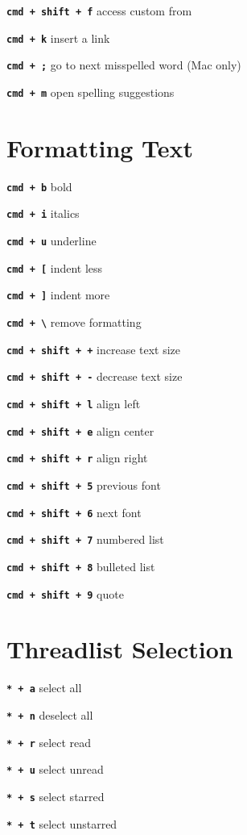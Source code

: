 \documentclass[11pt,letterpaper]{article}
\newcommand{\sck}[1]{\textbf{\texttt{#1}}}
\begin{document}
\sck{cmd + shift  + f} \dotfill access custom from

\sck{cmd  + k} \dotfill insert a link

\sck{cmd + ;} \dotfill go to next misspelled word (Mac only)

\sck{cmd + m} \dotfill open spelling suggestions


\section*{Formatting Text}

\sck{cmd  + b} \dotfill bold

\sck{cmd + i} \dotfill italics

\sck{cmd + u} \dotfill underline

\sck{cmd + [} \dotfill indent less

\sck{cmd + ]} \dotfill indent more

\sck{cmd + \textbackslash } \dotfill remove formatting

\sck{cmd  + shift  + +} \dotfill increase text size

\sck{cmd  + shift  + -} \dotfill decrease text size

\sck{cmd + shift  + l} \dotfill align left

\sck{cmd + shift  + e} \dotfill align center

\sck{cmd + shift  + r} \dotfill align right

\sck{cmd +  shift  + 5} \dotfill previous font

\sck{cmd  + shift  + 6} \dotfill next font

\sck{cmd  + shift  + 7} \dotfill numbered list

\sck{cmd  + shift  + 8} \dotfill bulleted list

\sck{cmd + shift  + 9} \dotfill quote


	

\section*{Threadlist Selection}

\sck{* + a} \dotfill select all	

\sck{* + n} \dotfill deselect all	

\sck{* + r} \dotfill select read	

\sck{* + u} \dotfill select unread	

\sck{* + s} \dotfill select starred	

\sck{* + t} \dotfill select unstarred	
\end{document}

